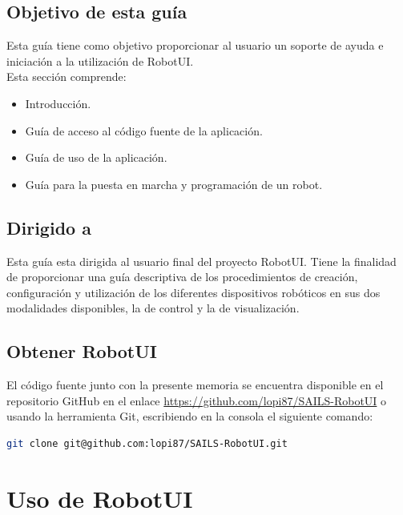 \subsection{Objetivo de esta guía}

Esta guía tiene como objetivo proporcionar al usuario un soporte de ayuda e iniciación a la utilización de RobotUI.\\

Esta sección comprende:\\

\begin{itemize}
 \item Introducción.
 \item Guía de acceso al código fuente de la aplicación.
 \item Guía de uso de la aplicación.
 \item Guía para la puesta en marcha y programación de un robot.
\end{itemize}

\subsection{Dirigido a}

Esta guía esta dirigida al usuario final del proyecto RobotUI. Tiene la finalidad de proporcionar una guía descriptiva de los procedimientos de creación, configuración y utilización de los diferentes dispositivos 
robóticos en sus dos modalidades disponibles, la de control y la de visualización.

\subsection{Obtener RobotUI}

El código fuente junto con la presente memoria se encuentra disponible en el repositorio GitHub en el enlace \url{https://github.com/lopi87/SAILS-RobotUI} o usando la herramienta
Git, escribiendo en la consola el siguiente comando:\\

\begin{lstlisting}[language=bash]
 git clone git@github.com:lopi87/SAILS-RobotUI.git 
\end{lstlisting}


\section{ Uso de RobotUI }
\label{sec:uso-robotui}


